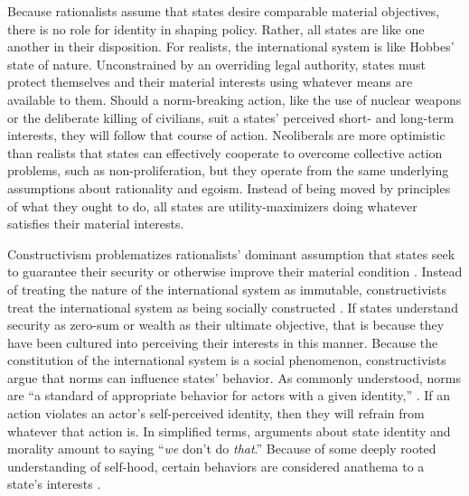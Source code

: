 \documentclass[12pt]{article}
\begin{document}
Because rationalists assume that states desire comparable material objectives, there is no role for identity in shaping policy. Rather, all states are like one another in their disposition. For realists, the international system is like Hobbes' state of nature. Unconstrained by an overriding legal authority, states must protect themselves and their material interests using whatever means are available to them. Should a norm-breaking action, like the use of nuclear weapons or the deliberate killing of civilians, suit a states' perceived short- and long-term interests, they will follow that course of action. Neoliberals are more optimistic than realists that states can effectively cooperate to overcome collective action problems, such as non-proliferation, but they operate from the same underlying assumptions about rationality and egoism. Instead of being moved by principles of what they ought to do, all states are utility-maximizers doing whatever satisfies their material interests.

Constructivism problematizes rationalists' dominant assumption that states seek to guarantee their security or otherwise improve their material condition \citep{wendt_social_1999}. Instead of treating the nature of the international system as immutable, constructivists treat the international system as being socially constructed \citep{finnemore_international_1998}. If states understand security as zero-sum or wealth as their ultimate objective, that is because they have been cultured into perceiving their interests in this manner. Because the constitution of the international system is a social phenomenon, constructivists argue that norms can influence states' behavior. As commonly understood, norms are “a standard of appropriate
behavior for actors with a given identity,” \citep[891]{finnemore_international_1998}. If an action violates an actor's self-perceived identity, then they will refrain from whatever that action is. In simplified terms, arguments about state identity and morality amount to saying “\textit{we} don't do \textit{that}.” Because of some deeply rooted understanding of self-hood, certain behaviors are considered anathema to a state's interests \citep{wendt_social_1999}.
\end{document}
